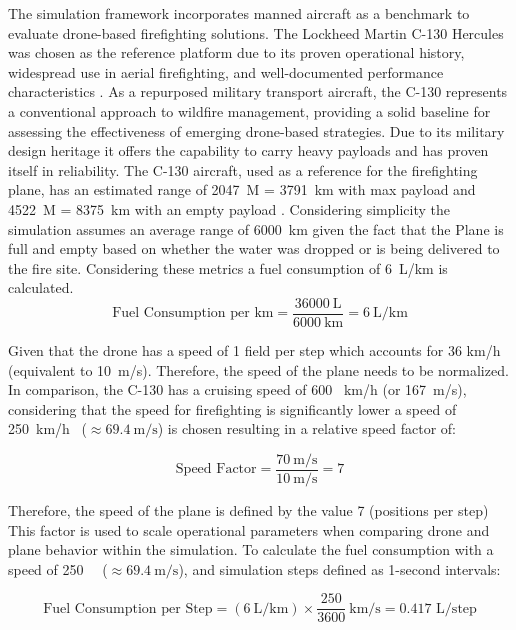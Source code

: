 \documentclass[twoside]{article}
\begin{document}
The simulation framework incorporates manned aircraft as a benchmark to evaluate drone-based firefighting solutions. The Lockheed Martin C-130 Hercules was chosen as the reference platform due to its proven operational history, widespread use in aerial firefighting, and well-documented performance characteristics \citep{LockheedC130Hercules2022}. As a repurposed military transport aircraft, the C-130 represents a conventional approach to wildfire management, providing a solid baseline for assessing the effectiveness of emerging drone-based strategies. Due to its military design heritage it offers the capability to carry heavy payloads and has proven itself in reliability.
The C-130 aircraft, used as a reference for the firefighting plane, has an estimated range of \SI{2047}{\nauticalmile} = \SI{3791}{\kilo\meter} with max payload and \SI{4522}{\nauticalmile} = \SI{8375}{\kilo\meter} with an empty payload \citep{LockheedC130Hercules2022}. Considering simplicity the simulation assumes an average range of \SI{6000}{\kilo\meter} given the fact that the Plane is full and empty based on whether the water was dropped or is being delivered to the fire site. Considering these metrics a fuel consumption of \SI{6}{\liter}/km is calculated.
\[
\text{Fuel Consumption per km} =\frac{36000~\text{L}}{6000~\text{km}} = 6~\text{L/km}
\]

Given that the drone has a speed of 1 field per step which accounts for 36 km/h \citep{DJIAGRAST50} (equivalent to 10~m/s). Therefore, the speed of the plane needs to be normalized. In comparison, the C-130 has a cruising speed of 600 ~km/h \citep{LockheedC130Hercules2022} (or 167~m/s), considering that the speed for firefighting is significantly lower a speed of 250~km/h \ (\(\approx 69.4~\text{m/s}\)) is chosen resulting in a relative speed factor of:

\begin{equation}
\text{Speed Factor}= \frac{70~\text{m/s}}{10~\text{m/s}} = 7
\end{equation}

Therefore, the speed of the plane is defined by the value 7 (positions per step)
This factor is used to scale operational parameters when comparing drone and plane behavior within the simulation. To calculate the fuel consumption with a speed of 250~ \ (\(\approx 69.4~\text{m/s}\)), and simulation steps defined as 1-second intervals:

\[
\text{Fuel Consumption per Step}= (6~\text{L/km}) \times \frac{250}{3600}~\text{km/s} = 0.417\text{ L/step}
\]
\end{document}
